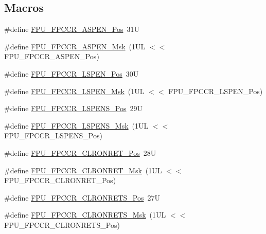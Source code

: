\subsection*{Macros}
\begin{DoxyCompactItemize}
\item 
\#define \mbox{\hyperlink{group___c_m_s_i_s___f_p_u_ga4228a923ddf665f868e56b4b9e9bff7b}{F\+P\+U\+\_\+\+F\+P\+C\+C\+R\+\_\+\+A\+S\+P\+E\+N\+\_\+\+Pos}}~31U
\item 
\#define \mbox{\hyperlink{group___c_m_s_i_s___f_p_u_ga309886ff6bbd25cb13c061c6683c6c0c}{F\+P\+U\+\_\+\+F\+P\+C\+C\+R\+\_\+\+A\+S\+P\+E\+N\+\_\+\+Msk}}~(1\+U\+L $<$$<$ F\+P\+U\+\_\+\+F\+P\+C\+C\+R\+\_\+\+A\+S\+P\+E\+N\+\_\+\+Pos)
\item 
\#define \mbox{\hyperlink{group___c_m_s_i_s___f_p_u_gac7d70e051fe759ad8fed83bf5b5aebc1}{F\+P\+U\+\_\+\+F\+P\+C\+C\+R\+\_\+\+L\+S\+P\+E\+N\+\_\+\+Pos}}~30U
\item 
\#define \mbox{\hyperlink{group___c_m_s_i_s___f_p_u_gaf4ab19de45df6522dd882bc116f938e9}{F\+P\+U\+\_\+\+F\+P\+C\+C\+R\+\_\+\+L\+S\+P\+E\+N\+\_\+\+Msk}}~(1\+U\+L $<$$<$ F\+P\+U\+\_\+\+F\+P\+C\+C\+R\+\_\+\+L\+S\+P\+E\+N\+\_\+\+Pos)
\item 
\#define \mbox{\hyperlink{group___c_m_s_i_s___f_p_u_ga705368bf3c52b5bb4edfbcb3e2631e1c}{F\+P\+U\+\_\+\+F\+P\+C\+C\+R\+\_\+\+L\+S\+P\+E\+N\+S\+\_\+\+Pos}}~29U
\item 
\#define \mbox{\hyperlink{group___c_m_s_i_s___f_p_u_ga73afcf0fe09c69e9625e11035cabb1c0}{F\+P\+U\+\_\+\+F\+P\+C\+C\+R\+\_\+\+L\+S\+P\+E\+N\+S\+\_\+\+Msk}}~(1\+U\+L $<$$<$ F\+P\+U\+\_\+\+F\+P\+C\+C\+R\+\_\+\+L\+S\+P\+E\+N\+S\+\_\+\+Pos)
\item 
\#define \mbox{\hyperlink{group___c_m_s_i_s___f_p_u_ga0b97b2fdac794f4fddab1e4342e0c104}{F\+P\+U\+\_\+\+F\+P\+C\+C\+R\+\_\+\+C\+L\+R\+O\+N\+R\+E\+T\+\_\+\+Pos}}~28U
\item 
\#define \mbox{\hyperlink{group___c_m_s_i_s___f_p_u_gadedc12ec237657721a613c6f47abed6f}{F\+P\+U\+\_\+\+F\+P\+C\+C\+R\+\_\+\+C\+L\+R\+O\+N\+R\+E\+T\+\_\+\+Msk}}~(1\+U\+L $<$$<$ F\+P\+U\+\_\+\+F\+P\+C\+C\+R\+\_\+\+C\+L\+R\+O\+N\+R\+E\+T\+\_\+\+Pos)
\item 
\#define \mbox{\hyperlink{group___c_m_s_i_s___f_p_u_gabb18ccf9d1b0a4bef3b0823f18eb96ba}{F\+P\+U\+\_\+\+F\+P\+C\+C\+R\+\_\+\+C\+L\+R\+O\+N\+R\+E\+T\+S\+\_\+\+Pos}}~27U
\item 
\#define \mbox{\hyperlink{group___c_m_s_i_s___f_p_u_ga103d932807c15250d96711952878eeb2}{F\+P\+U\+\_\+\+F\+P\+C\+C\+R\+\_\+\+C\+L\+R\+O\+N\+R\+E\+T\+S\+\_\+\+Msk}}~(1\+U\+L $<$$<$ F\+P\+U\+\_\+\+F\+P\+C\+C\+R\+\_\+\+C\+L\+R\+O\+N\+R\+E\+T\+S\+\_\+\+Pos)
$$
\end{DoxyCompactItemize}
